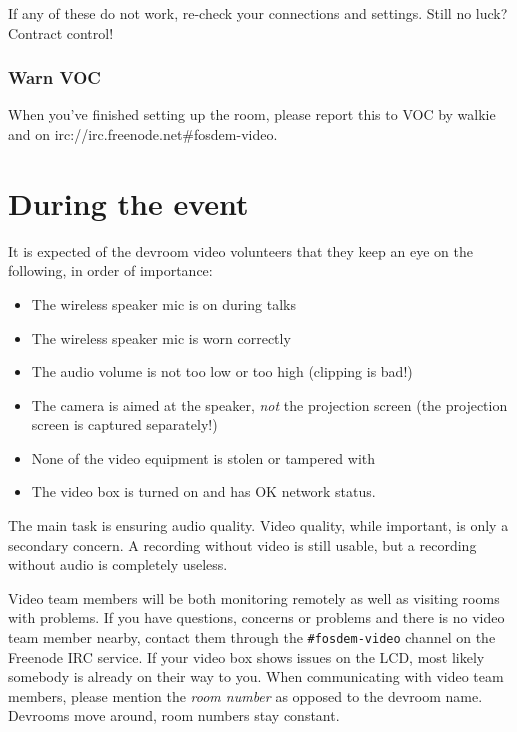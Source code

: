 \documentclass{article}
\begin{document}
If any of these do not work, re-check your connections and settings. Still no luck? Contract control!

\subsubsection{Warn VOC}
When you've finished setting up the room, please report this to VOC by walkie and on irc://irc.freenode.net\#fosdem-video.

\section{During the event}
It is expected of the devroom video volunteers that they keep an eye on the following, in order of importance:
\begin{itemize}
  \item The wireless speaker mic is on during talks
  \item The wireless speaker mic is worn correctly
  \item The audio volume is not too low or too high (clipping is bad!)
  \item The camera is aimed at the speaker, \emph{not} the projection screen (the projection screen is captured separately!)
  \item None of the video equipment is stolen or tampered with
  \item The video box is turned on and has OK network status.
\end{itemize}
The main task is ensuring audio quality. Video quality, while important, is only a secondary concern. A recording without video is still usable, but a recording without audio is completely useless.

Video team members will be both monitoring remotely as well as visiting rooms with problems. If you have questions, concerns or problems and there is no video team member nearby, contact them through the \texttt{\#fosdem-video} channel on the Freenode IRC service. If your video box shows issues on the LCD, most likely somebody is already on their way to you. When communicating with video team members, please mention the \emph{room number} as opposed to the devroom name. Devrooms move around, room numbers stay constant.
\end{document}
